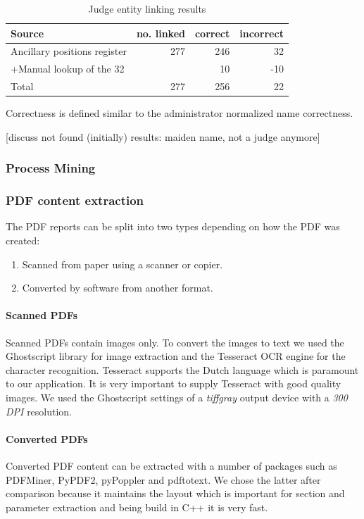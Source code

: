 \begin{table}[h]
\caption{Judge entity linking results}
\centering
\begin{tabular}{l r r r}
\hline\hline
Source & no. linked & correct & incorrect\\
\hline
Ancillary positions register & 277 & 246 & 32\\
+Manual lookup of the 32 &   & 10 & -10\\
\hline
Total & 277 & 256 & 22\\
\hline
\end{tabular}
\label{table:judge_linking}
\end{table}

Correctness is defined similar to the administrator normalized name correctness.

[discuss not found (initially) results: maiden name, not a judge anymore]

\subsubsection{Process Mining}

\subsubsection{PDF content extraction}
The PDF reports can be split into two types depending on how the PDF was created:
\begin{enumerate}
\item Scanned from paper using a scanner or copier.
\item Converted by software from another format.
\end{enumerate}

\paragraph{Scanned PDFs}
Scanned PDFs contain images only. To convert the images to text we used the Ghostscript library for image extraction and the Tesseract OCR engine for the character recognition. Tesseract supports the Dutch language which is paramount to our application. It is very important to supply Tesseract with good quality images. We used the Ghostscript settings of a \emph{tiffgray} output device with a \emph{300 DPI} resolution. 

\paragraph{Converted PDFs}
Converted PDF content can be extracted with a number of packages such as PDFMiner, PyPDF2, pyPoppler and pdftotext. We chose the latter after comparison because it maintains the layout which is important for section and parameter extraction and being build in C++ it is very fast.

